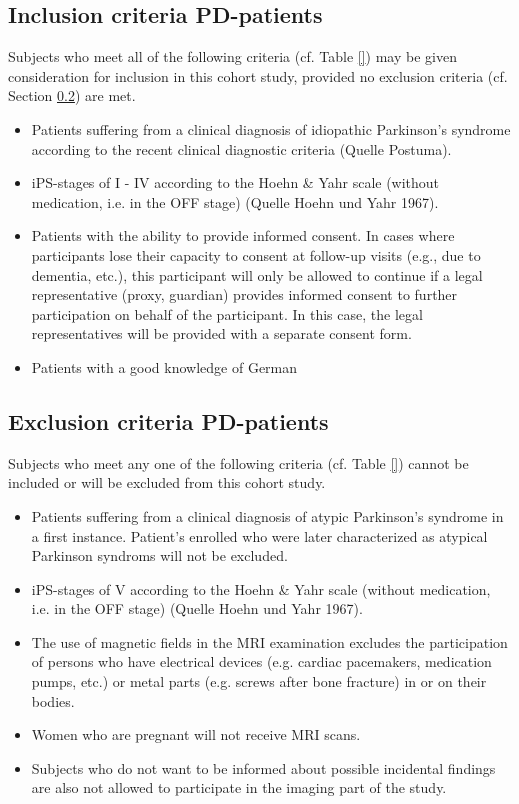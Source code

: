 \subsection{Inclusion criteria \ac{PD}-patients}
\label{sec:inclusion_criteriaIPS}
Subjects who meet all of the following criteria (cf. Table \ref{}) may be given consideration for inclusion in this cohort study, provided no exclusion criteria (cf. Section \ref{sec:exclusion_criteriaIPS}) are met.

\begin{itemize}
\item Patients suffering from a clinical diagnosis of idiopathic Parkinson's syndrome according to the recent clinical diagnostic criteria (Quelle Postuma).
\item \ac{iPS}-stages of I - IV according to the Hoehn \& Yahr scale (without medication, i.e. in the OFF stage) (Quelle Hoehn und Yahr 1967).
\item Patients with the ability to provide informed consent. In cases where participants lose their capacity to consent at follow-up visits (e.g., due to dementia, etc.), this participant will only be allowed to continue if a legal representative (proxy, guardian) provides informed consent to further participation on behalf of the participant. In this case, the legal representatives will be provided with a separate consent form.   
\item Patients with a good knowledge of German
\end{itemize}

\subsection{Exclusion criteria \ac{PD}-patients}
\label{sec:exclusion_criteriaIPS}
Subjects who meet any one of the following criteria (cf. Table \ref{}) cannot be included or will be excluded from this cohort study.
\begin{itemize}
\item Patients suffering from a clinical diagnosis of atypic Parkinson's syndrome in a first instance. Patient's enrolled who were later characterized as atypical Parkinson syndroms will not be excluded.
\item \ac{iPS}-stages of V according to the Hoehn \& Yahr scale (without medication, i.e. in the OFF stage) (Quelle Hoehn und Yahr 1967).
\item The use of magnetic fields in the MRI examination excludes the participation of persons who have electrical devices (e.g. cardiac pacemakers, medication pumps, etc.) or metal parts (e.g. screws after bone fracture) in or on their bodies. 
\item Women who are pregnant will not receive \ac{MRI} scans.
\item Subjects who do not want to be informed about possible incidental findings are also not allowed to participate in the imaging part of the study.
\end{itemize}

